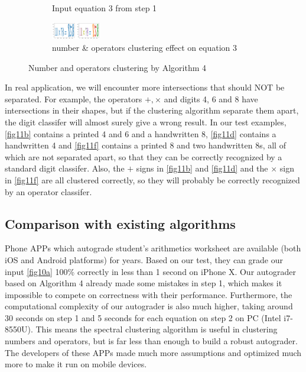 \begin{figure}[htbp]
\begin{subfigure}[t]{0.33\textwidth}
        \caption{Input equation 3 from step 1}\label{fig11e}		
    \end{subfigure}
    \begin{subfigure}[t]{0.66\textwidth}
        \includegraphics[width=\textwidth,height=0.3in]{../TestSamplePictures/test5_result.png}
        \caption{number \& operators clustering effect on equation 3}\label{fig11f}
    \end{subfigure}
    \caption{Number and operators clustering by Algorithm 4}\label{fig11}
\end{figure}
In real application, we will encounter more intersections that should NOT be separated.
For example, the operators \(+,\times\) and digits 4, 6 and 8 have intersections in their shapes, but if the clustering algorithm separate them apart, the digit classifer will almost surely give a wrong result.
In our test examples, \autoref{fig11b} contains a printed 4 and 6 and a handwritten 8, \autoref{fig11d} contains a handwritten 4 and \autoref{fig11f} contains a printed 8 and two handwritten 8s, all of which are not separated apart, so that they can be correctly recognized by a standard digit classifer.
Also, the \(+\) signs in \autoref{fig11b} and \autoref{fig11d} and the \(\times\) sign in \autoref{fig11f} are all clustered correctly, so they will probably be correctly recognized by an operator classifer.

\subsection{Comparison with existing algorithms}
Phone APPs which autograde student's arithmetics worksheet are available (both iOS and Android platforms) for years.
Based on our test, they can grade our input \autoref{fig10a} 100\% correctly in less than 1 second on iPhone X.
Our autograder based on Algorithm 4 already made some mistakes in step 1, which makes it impossible to compete on correctness with their performance.
Furthermore, the computational complexity of our autograder is also much higher, taking around 30 seconds on step 1 and 5 seconds for each equation on step 2 on PC (Intel i7-8550U).
This means the spectral clustering algorithm is useful in clustering numbers and operators, but is far less than enough to build a robust autograder.
The developers of these APPs made much more assumptions and optimized much more to make it run on mobile devices.